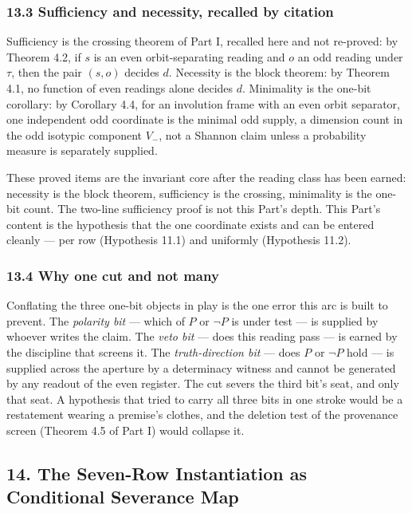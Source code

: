 \documentclass[10pt,twocolumn]{article}
\begin{document}
\subsubsection{13.3 Sufficiency and necessity, recalled by
citation}\label{sufficiency-and-necessity-recalled-by-citation}

Sufficiency is the crossing theorem of Part I, recalled here and not
re-proved: by Theorem 4.2, if \(s\) is an even orbit-separating reading
and \(o\) an odd reading under \(\tau\), then the pair \((s, o)\)
decides \(d\). Necessity is the block theorem: by Theorem 4.1, no
function of even readings alone decides \(d\). Minimality is the one-bit
corollary: by Corollary 4.4, for an involution frame with an even orbit
separator, one independent odd coordinate is the minimal odd supply, a
dimension count in the odd isotypic component \(V_{-}\), not a Shannon
claim unless a probability measure is separately supplied.

These proved items are the invariant core after the reading class has
been earned: necessity is the block theorem, sufficiency is the
crossing, minimality is the one-bit count. The two-line sufficiency
proof is not this Part's depth. This Part's content is the hypothesis
that the one coordinate exists and can be entered cleanly --- per row
(Hypothesis 11.1) and uniformly (Hypothesis 11.2).

\subsubsection{13.4 Why one cut and not
many}\label{why-one-cut-and-not-many}

Conflating the three one-bit objects in play is the one error this arc
is built to prevent. The \emph{polarity bit} --- which of \(P\) or
\(\neg P\) is under test --- is supplied by whoever writes the claim.
The \emph{veto bit} --- does this reading pass --- is earned by the
discipline that screens it. The \emph{truth-direction bit} --- does
\(P\) or \(\neg P\) hold --- is supplied across the aperture by a
determinacy witness and cannot be generated by any readout of the even
register. The cut severs the third bit's seat, and only that seat. A
hypothesis that tried to carry all three bits in one stroke would be a
restatement wearing a premise's clothes, and the deletion test of the
provenance screen (Theorem 4.5 of Part I) would collapse it.

\subsection{14. The Seven-Row Instantiation as Conditional Severance
Map}\label{the-seven-row-instantiation-as-conditional-severance-map}
\end{document}
